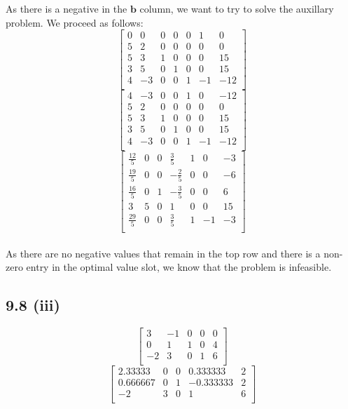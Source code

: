 \documentclass[letterpaper,12pt]{article}
\theoremstyle{definition}
\begin{document}
As there is a negative in the $\mathbf{b}$ column, we want to try to solve the auxillary problem. We proceed as follows:
\[
\begin{bmatrix}
0&0&0&0&0&1&0 \\
5&2&0&0&0&0&0 \\
5&3&1&0&0&0&15 \\
3&5&0&1&0&0&15 \\
4&-3&0&0&1&-1&-12 \\
\end{bmatrix}
\]
\[
\begin{bmatrix}
4&-3&0&0&1&0&-12 \\
5&2&0&0&0&0&0 \\
5&3&1&0&0&0&15 \\
3&5&0&1&0&0&15 \\
4&-3&0&0&1&-1&-12 \\
\end{bmatrix}
\]
\[
\begin{bmatrix}
\frac{12}{5}&0&0&\frac{3}{5}&1&0&-3 \\
\frac{19}{5}&0&0&-\frac{2}{5}&0&0&-6 \\
\frac{16}{5}&0&1&-\frac{3}{5}&0&0&6 \\
3&5&0&1&0&0&15 \\
\frac{29}{5}&0&0&\frac{3}{5}&1&-1&-3 \\
\end{bmatrix}
\]
\\
As there are no negative values that remain in the top row and there is a non-zero entry in the optimal value slot, we know that the problem is infeasible.

\subsection*{9.8 (iii)}
\[
\begin{bmatrix}
 3 & -1 & 0 & 0 & 0 \\
  0 &  1 & 1 & 0 & 4 \\
 -2 &  3 & 0 & 1 & 6 \\
    
\end{bmatrix}
\]
\[
\begin{bmatrix}
  2.33333  & 0 & 0 &  0.333333 & 2 \\
  0.666667 & 0 & 1 & -0.333333 & 2 \\
 -2        & 3 & 0 &  1        & 6 \\
    
\end{bmatrix}
\]
 
\end{document}
